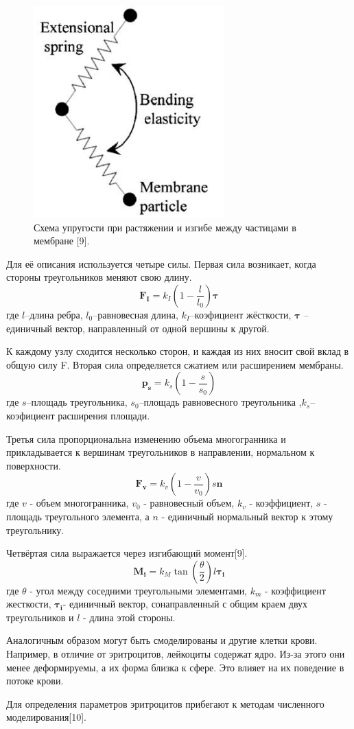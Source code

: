 \documentclass[a4paper, 14pt]{article}
\begin{document}
\begin{figure}[h]
\centering
\includegraphics[width=0.3\linewidth]{mol3.png}
\caption{ Схема упругости при растяжении и изгибе между частицами в мембране [9].}
\label{fig:mpr}
\end{figure}

Для её описания используется четыре силы.
Первая сила возникает, когда стороны треугольников меняют свою длину.
$$\mathbf {F_I}=k_I(1- \frac{l}{l_0}) \mathbf {\tau}$$
где $l$--длина ребра, $l_0$--равновесная длина, $k_I$--коэфициент жёсткости, $\mathbf { \tau}$ --единичный вектор, направленный от одной вершины к другой.

К каждому узлу сходится несколько сторон, и каждая из них вносит свой вклад в общую силу F. Вторая сила определяется сжатием или расширением мембраны.  
$$\mathbf {p_s}=k_s(1- \frac{s}{s_0})$$
где $s$--площадь треугольника, $s_0$--площадь равновесного треугольника ,$k_s$--коэфициент расширения площади.

Третья сила пропорциональна изменению объема многогранника и прикладывается к вершинам треугольников в направлении, нормальном к поверхности. 
$$\mathbf {F_v}=k_v(1- \frac{v}{v_0}) s \mathbf{n}$$
где $v$ - объем многогранника, $v_0$ - равновесный объем, $k_v$ - коэффициент, $s$ - площадь
треугольного элемента, а $n$ - единичный нормальный вектор к этому треугольнику.

Четвёртая сила выражается через изгибающий момент[9].
$$\mathbf {M_i}=k_M \tan(\frac{\theta}{2})l \mathbf{\tau_i}$$
где $\theta$ - угол между соседними треугольными элементами, $k_m$ - коэффициент жесткости, $\mathbf{\tau_i}$- единичный вектор, сонаправленный с общим краем двух треугольников и $l$ - длина этой стороны.

Аналогичным образом могут быть смоделированы и другие клетки крови. Например, в отличие от эритроцитов, лейкоциты содержат ядро. Из-за этого они менее деформируемы, а их форма близка к сфере. Это влияет на их поведение в потоке крови.

Для определения параметров эритроцитов прибегают к методам численного моделирования[10].
\end{document}
